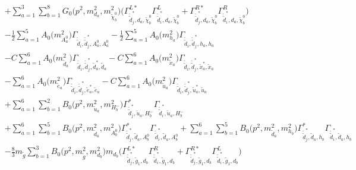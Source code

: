 \begin{itemize}
\begin{align}
 &+\sum_{a=1}^{3}\sum_{b=1}^{8}{G_0\Big(p^{2},m^2_{d_{{a}}},m^2_{\tilde{\chi}^0_{{b}}}\Big)} \Big({\Gamma^{L*}_{\check{\tilde{d}}^*_{{j}},d_{{a}},\tilde{\chi}^0_{{b}}}} {\Gamma^L_{\check{\tilde{d}}^*_{{i}},d_{{a}},\tilde{\chi}^0_{{b}}}}  + {\Gamma^{R*}_{\check{\tilde{d}}^*_{{j}},d_{{a}},\tilde{\chi}^0_{{b}}}} {\Gamma^R_{\check{\tilde{d}}^*_{{i}},d_{{a}},\tilde{\chi}^0_{{b}}}} \Big)\nonumber \\ 
 &-\frac{1}{2} \sum_{a=1}^{5}{A_0\Big(m^2_{A^0_{{a}}}\Big)} {\Gamma_{\check{\tilde{d}}_{{i}},\check{\tilde{d}}^*_{{j}},A^0_{{a}},A^0_{{a}}}}  -\frac{1}{2} \sum_{a=1}^{5}{A_0\Big(m^2_{h_{{a}}}\Big)} {\Gamma_{\check{\tilde{d}}_{{i}},\check{\tilde{d}}^*_{{j}},h_{{a}},h_{{a}}}}  \nonumber \\ 
 &- C \sum_{a=1}^{6}{A_0\Big(m^2_{\tilde{d}_{{a}}}\Big)} {\Gamma_{\check{\tilde{d}}_{{i}},\check{\tilde{d}}^*_{{j}},\tilde{d}^*_{{a}},\tilde{d}_{{a}}}}  - C \sum_{a=1}^{6}{A_0\Big(m^2_{\tilde{x}_{{a}}}\Big)} {\Gamma_{\check{\tilde{d}}_{{i}},\check{\tilde{d}}^*_{{j}},\tilde{x}^*_{{a}},\tilde{x}_{{a}}}}  \nonumber \\ 
 &- \sum_{a=1}^{6}{A_0\Big(m^2_{\tilde{e}_{{a}}}\Big)} {\Gamma_{\check{\tilde{d}}_{{i}},\check{\tilde{d}}^*_{{j}},\tilde{e}^*_{{a}},\tilde{e}_{{a}}}}  - C \sum_{a=1}^{6}{A_0\Big(m^2_{\tilde{u}_{{a}}}\Big)} {\Gamma_{\check{\tilde{d}}_{{i}},\check{\tilde{d}}^*_{{j}},\tilde{u}^*_{{a}},\tilde{u}_{{a}}}}  \nonumber \\ 
 &+\sum_{a=1}^{6}\sum_{b=1}^{2}{B_0\Big(p^{2},m^2_{\tilde{u}_{{a}}},m^2_{H^-_{{b}}}\Big)} {\Gamma^*_{\check{\tilde{d}}^*_{{j}},\tilde{u}_{{a}},H^-_{{b}}}} {\Gamma_{\check{\tilde{d}}^*_{{i}},\tilde{u}_{{a}},H^-_{{b}}}} \nonumber \\ 
 &+\sum_{a=1}^{6}\sum_{b=1}^{5}{B_0\Big(p^{2},m^2_{\tilde{d}_{{a}}},m^2_{A^0_{{b}}}\Big)} {\Gamma^*_{\check{\tilde{d}}^*_{{j}},\tilde{d}_{{a}},A^0_{{b}}}} {\Gamma_{\check{\tilde{d}}^*_{{i}},\tilde{d}_{{a}},A^0_{{b}}}} +\sum_{a=1}^{6}\sum_{b=1}^{5}{B_0\Big(p^{2},m^2_{\tilde{d}_{{a}}},m^2_{h_{{b}}}\Big)} {\Gamma^*_{\check{\tilde{d}}^*_{{j}},\tilde{d}_{{a}},h_{{b}}}} {\Gamma_{\check{\tilde{d}}^*_{{i}},\tilde{d}_{{a}},h_{{b}}}} \nonumber \\ 
 &-\frac{8}{3} m_{\tilde{g}} \sum_{b=1}^{3}{B_0\Big(p^{2},m^2_{\tilde{g}},m^2_{d_{{b}}}\Big)} m_{d_{{b}}} \Big({\Gamma^{L*}_{\check{\tilde{d}}^*_{{j}},\tilde{g}_{{1}},d_{{b}}}} {\Gamma^R_{\check{\tilde{d}}^*_{{i}},\tilde{g}_{{1}},d_{{b}}}}  + {\Gamma^{R*}_{\check{\tilde{d}}^*_{{j}},\tilde{g}_{{1}},d_{{b}}}} {\Gamma^L_{\check{\tilde{d}}^*_{{i}},\tilde{g}_{{1}},d_{{b}}}} \Big) \nonumber \\ 

\end{align}
\end{itemize}
